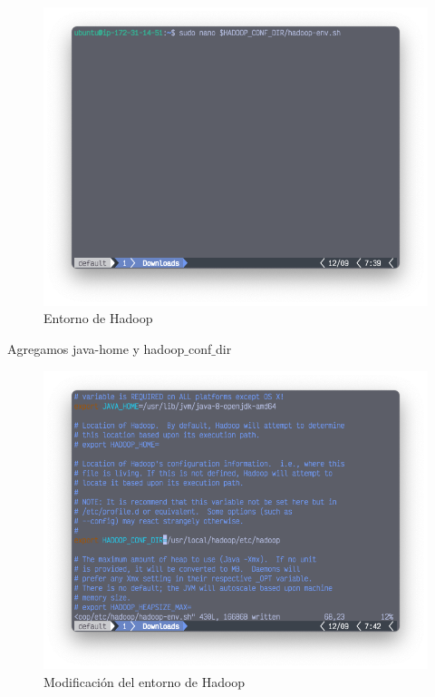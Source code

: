 \begin{figure}[h]
	\centering
	\includegraphics[scale=.35] {img/25-openHadoop_conf_dir}
	\caption{Entorno de Hadoop}
	\label{fig:25}	
\end{figure}

Agregamos java-home y hadoop$\_$conf$\_$dir
 \clearpage
\begin{figure}[h]
	\centering
	\includegraphics[scale=.35] {img/26-exportJAVA_HOME-HADOOP_CONF_DIR}
	\caption{Modificación del entorno de Hadoop}
	\label{fig:26}	
\end{figure}
